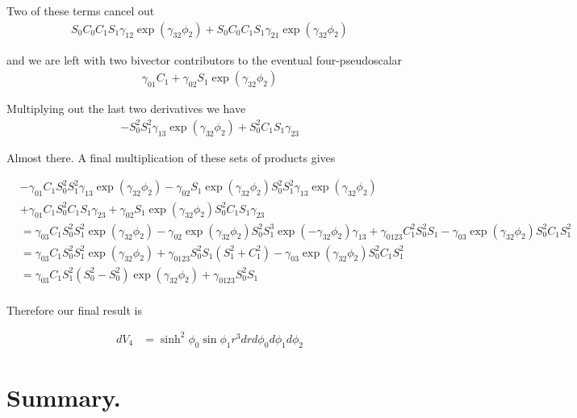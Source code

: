 \documentclass{article}
\begin{document}
Two of these terms cancel out
\begin{align*}
S_0 C_0 C_1 S_1 \gamma_{12} \exp( \gamma_{32} \phi_2 ) 
+S_0 C_0 C_1 S_1 \gamma_{21} \exp( \gamma_{32} \phi_2 ) 
\end{align*}

and we are left with two bivector contributors to the eventual four-pseudoscalar
\begin{align*}
\gamma_{01} C_1 
+\gamma_{02} S_1 \exp( \gamma_{32} \phi_2 ) 
\end{align*}

Multiplying out the last two derivatives we have
\begin{align*}
-S_0^2 S_1^2 \gamma_{13} \exp( \gamma_{32} \phi_2 )
+ S_0^2 C_1 S_1 \gamma_{23}
\end{align*}

Almost there.  A final multiplication of these sets of products gives

\begin{align*}
&-\gamma_{01} C_1 S_0^2 S_1^2 \gamma_{13} \exp( \gamma_{32} \phi_2 )
-\gamma_{02} S_1 \exp( \gamma_{32} \phi_2 ) S_0^2 S_1^2 \gamma_{13} \exp( \gamma_{32} \phi_2 ) \\
&+\gamma_{01} C_1 S_0^2 C_1 S_1 \gamma_{23}
+\gamma_{02} S_1 \exp( \gamma_{32} \phi_2 ) S_0^2 C_1 S_1 \gamma_{23} \\
&=
\gamma_{03} C_1 S_0^2 S_1^2 \exp( \gamma_{32} \phi_2 )
-\gamma_{02} \exp( \gamma_{32} \phi_2 ) S_0^2 S_1^3 \exp( -\gamma_{32} \phi_2 ) \gamma_{13}
+\gamma_{0123} C_1^2 S_0^2 S_1 
-\gamma_{03} \exp( \gamma_{32} \phi_2 ) S_0^2 C_1 S_1^2 \\
&=
\gamma_{03} C_1 S_0^2 S_1^2 \exp( \gamma_{32} \phi_2 )
+\gamma_{0123} S_0^2 S_1 (S_1^2 + C_1^2)
-\gamma_{03} \exp( \gamma_{32} \phi_2 ) S_0^2 C_1 S_1^2 \\
&=
\gamma_{03} C_1 S_1^2 (S_0^2 -S_0^2)\exp( \gamma_{32} \phi_2 )
+\gamma_{0123} S_0^2 S_1  \\
\end{align*}

Therefore our final result is

\begin{align*}
dV_4 &= \sinh^2 \phi_0 \sin\phi_1 r^3 dr d\phi_0 d\phi_1 d\phi_2
\end{align*}

\section{ Summary. }
\end{document}
